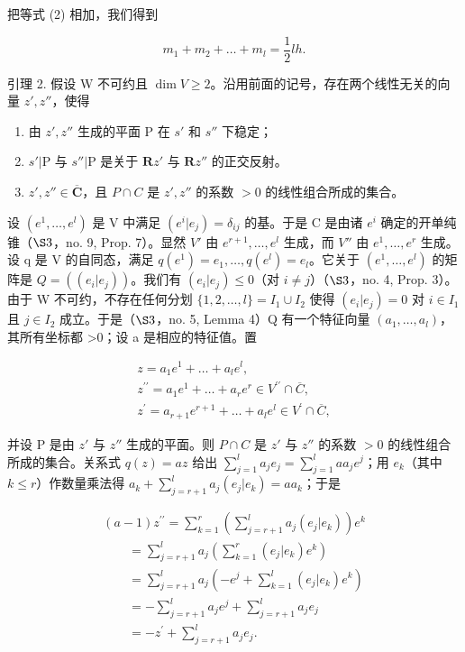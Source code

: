 把等式 (2) 相加，我们得到

\[
m _ {1} + m _ {2} + \dots + m _ {l} = \frac {1}{2} l h.\tag{3}
\]

引理 2. 假设 W 不可约且 \(\dim V \geqslant 2\)。沿用前面的记号，存在两个线性无关的向量 \(z', z''\)，使得

\begin{enumerate}
\def\labelenumi{(\roman{enumi})}
\item
  由 \(z', z''\) 生成的平面 P 在 \(s'\) 和 \(s''\) 下稳定；
\item
  \(s'|\mathrm{P}\) 与 \(s''|\mathrm{P}\) 是关于 \(\mathbf{R}z'\) 与 \(\mathbf{R}z''\) 的正交反射。
\item
  \(z', z'' \in \overline{\mathbf{C}}\)，且 \(P \cap C\) 是 \(z', z''\) 的系数 \(> 0\) 的线性组合所成的集合。
\end{enumerate}

设 \((e^{1},\ldots,e^{l})\) 是 V 中满足 \((e^{i}|e_{j})=\delta_{ij}\) 的基。于是 C 是由诸 \(e^{i}\) 确定的开单纯锥（\(\S 3\)，no. 9, Prop. 7）。显然 \(V'\) 由 \(e^{r+1},\ldots,e^{l}\) 生成，而 \(V''\) 由 \(e^{1},\ldots,e^{r}\) 生成。设 q 是 V 的自同态，满足 \(q(e^{1})=e_{1},\ldots,q(e^{l})=e_{l}\)。它关于 \((e^{1},\ldots,e^{l})\) 的矩阵是 \(Q=((e_{i}|e_{j}))\)。我们有 \((e_{i}|e_{j})\leqslant0\)（对 \(i\neq j\)）（\(\S 3\)，no. 4, Prop. 3）。由于 W 不可约，不存在任何分划 \(\{1,2,\ldots,l\}=I_{1}\cup I_{2}\) 使得 \((e_{i}|e_{j})=0\) 对 \(i\in I_{1}\) 且 \(j\in I_{2}\) 成立。于是（\(\S 3\)，no. 5, Lemma 4）Q 有一个特征向量 \((a_{1},\ldots,a_{l})\)，其所有坐标都 \textgreater0；设 a 是相应的特征值。置

\[
\begin{array}{r} z = a _ {1} e ^ {1} + \dots + a _ {l} e ^ {l}, \\ z ^ {\prime \prime} = a _ {1} e ^ {1} + \dots + a _ {r} e ^ {r} \in V ^ {\prime \prime} \cap \overline {{C}}, \\ z ^ {\prime} = a _ {r + 1} e ^ {r + 1} + \dots + a _ {l} e ^ {l} \in V ^ {\prime} \cap \overline {{C}}, \end{array}
\]

并设 P 是由 \(z'\) 与 \(z''\) 生成的平面。则 \(P \cap C\) 是 \(z'\) 与 \(z''\) 的系数 \(> 0\) 的线性组合所成的集合。关系式 \(q(z) = az\) 给出 \(\sum_{j=1}^{l} a_j e_j = \sum_{j=1}^{l} aa_j e^j\)；用 \(e_k\)（其中 \(k \leqslant r\)）作数量乘法得 \(a_k + \sum_{j=r+1}^{l} a_j (e_j | e_k) = aa_k\)；于是

\[
\begin{array}{l} (a - 1) z ^ {\prime \prime} = \sum_ {k = 1} ^ {r} \left(\sum_ {j = r + 1} ^ {l} a _ {j} (e _ {j} | e _ {k})\right) e ^ {k} \\ \qquad = \sum_ {j = r + 1} ^ {l} a _ {j} \left(\sum_ {k = 1} ^ {r} (e _ {j} | e _ {k}) e ^ {k}\right) \\ \qquad = \sum_ {j = r + 1} ^ {l} a _ {j} \left(- e ^ {j} + \sum_ {k = 1} ^ {l} (e _ {j} | e _ {k}) e ^ {k}\right) \\ \qquad = - \sum_ {j = r + 1} ^ {l} a _ {j} e ^ {j} + \sum_ {j = r + 1} ^ {l} a _ {j} e _ {j} \\ \qquad = - z ^ {\prime} + \sum_ {j = r + 1} ^ {l} a _ {j} e _ {j}. \end{array}
\]

